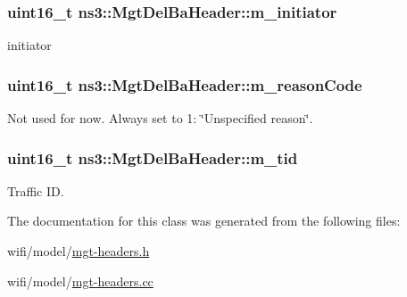 \subsubsection[{\texorpdfstring{m\+\_\+initiator}{m_initiator}}]{\setlength{\rightskip}{0pt plus 5cm}uint16\+\_\+t ns3\+::\+Mgt\+Del\+Ba\+Header\+::m\+\_\+initiator\hspace{0.3cm}{\ttfamily [private]}}\hypertarget{classns3_1_1MgtDelBaHeader_a52b4716cc8fc56c28cca6c84acc035b3}{}\label{classns3_1_1MgtDelBaHeader_a52b4716cc8fc56c28cca6c84acc035b3}


initiator 

\subsubsection[{\texorpdfstring{m\+\_\+reason\+Code}{m_reasonCode}}]{\setlength{\rightskip}{0pt plus 5cm}uint16\+\_\+t ns3\+::\+Mgt\+Del\+Ba\+Header\+::m\+\_\+reason\+Code\hspace{0.3cm}{\ttfamily [private]}}\hypertarget{classns3_1_1MgtDelBaHeader_aa2cf808419b9cc867bc97943b96e8db9}{}\label{classns3_1_1MgtDelBaHeader_aa2cf808419b9cc867bc97943b96e8db9}


Not used for now. Always set to 1\+: \char`\"{}\+Unspecified reason\char`\"{}. 

\subsubsection[{\texorpdfstring{m\+\_\+tid}{m_tid}}]{\setlength{\rightskip}{0pt plus 5cm}uint16\+\_\+t ns3\+::\+Mgt\+Del\+Ba\+Header\+::m\+\_\+tid\hspace{0.3cm}{\ttfamily [private]}}\hypertarget{classns3_1_1MgtDelBaHeader_af1275ea992066afa3ac4e56263604801}{}\label{classns3_1_1MgtDelBaHeader_af1275ea992066afa3ac4e56263604801}


Traffic ID. 



The documentation for this class was generated from the following files\+:\begin{DoxyCompactItemize}
\item 
wifi/model/\hyperlink{mgt-headers_8h}{mgt-\/headers.\+h}\item 
wifi/model/\hyperlink{mgt-headers_8cc}{mgt-\/headers.\+cc}\end{DoxyCompactItemize}
